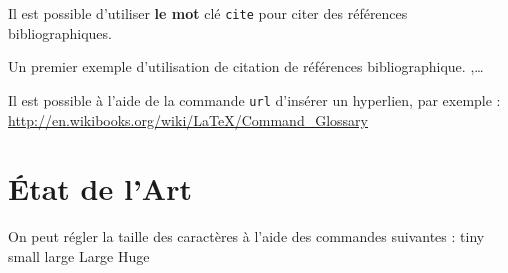 \documentclass[twocolumn,a4paper]{IEEEtranfr}
\begin{document}

Il est possible d'utiliser {\color{red}\textbf{le mot}} clé {\tt cite} pour citer des références
bibliographiques.  

Un premier exemple d'utilisation de citation de références bibliographique. 
\cite{akgu07},\cite{akgu091}\cite{zwic00}\cite{loredo_accuracy_2001}\ldots

Il est possible à l'aide de la commande {\tt url{}} d'insérer un
hyperlien, par exemple : \url{http://en.wikibooks.org/wiki/LaTeX/Command_Glossary}

\section{État de l'Art} 
On peut régler la taille des caractères à l'aide des commandes suivantes : 
{\tiny tiny \small small \large large \Large Large \Huge Huge}
\par
\end{document}

